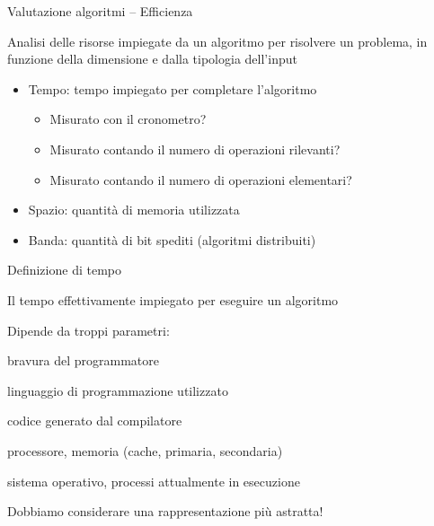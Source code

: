 \begin{frame}{Valutazione algoritmi -- Efficienza}
	
\begin{myboxtitle}
Analisi delle \alert{risorse} impiegate da un algoritmo per risolvere un problema, in
funzione della \alert{dimensione} e dalla \alert{tipologia} dell'input
\end{myboxtitle}

\medskip

\begin{myboxtitle}[Risorse]
\begin{itemize}
\item \alert{Tempo}: tempo impiegato per completare l'algoritmo
\begin{itemize}
	\item Misurato con il cronometro?
	\item Misurato contando il numero di operazioni rilevanti?
	\item Misurato contando il numero di operazioni elementari?
\end{itemize}
\item \alert{Spazio}: quantità di memoria utilizzata
\item \alert{Banda}: quantità di bit spediti (algoritmi distribuiti)
\end{itemize}

\end{myboxtitle}

\end{frame}

\begin{frame}{Definizione di tempo}

\begin{myboxtitle}
Il tempo effettivamente impiegato per eseguire un algoritmo
\end{myboxtitle}


\begin{mybox}
Dipende da troppi parametri:
\BI
\item bravura del programmatore
\item linguaggio di programmazione utilizzato
\item codice generato dal compilatore
\item processore, memoria (cache, primaria, secondaria)
\item sistema operativo, processi attualmente in esecuzione
\EI
\end{mybox}

\begin{mybox}
\alert{Dobbiamo considerare una rappresentazione più astratta!}
\end{mybox}

\end{frame}

